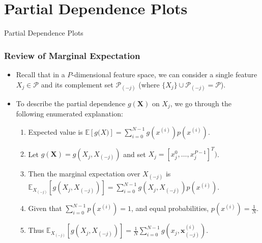 \section{Partial Dependence Plots}

\begin{frame}[c]
\Huge{\centerline{Partial Dependence Plots}}
\end{frame}

\begin{frame}\frametitle{Review of Marginal Expectation}
	\begin{itemize}
		\item Recall that in a $P$-dimensional feature space, we can consider a single feature $X_j \in \mathcal{P}$ and its complement set $\mathcal{P}_{(-j)}$ (where $\{X_j\} \cup \mathcal{P}_{(-j)} = \mathcal{P}$). 
		\item To describe the partial dependence $g(\mathbf{X})$ on $X_j$, we go through the following enumerated explanation:
		\begin{enumerate}
			\item Expected value is $\mathbb{E}[g\mathbf(X)] = \displaystyle\sum_{i = 0}^{N-1}g(x^{(i)})p(x^{(i)})$.
			\item  Let $g(\mathbf{X}) = g(X_j, X_{(-j)})$ and set $X_j = [x_{j}^{0}, \dots, x_{j}^{P-1}]^T)$. 
			\item Then the marginal expectation over $X_{(-j)}$ is $\mathbb{E}_{X_{(-j)}}\left[g(X_j, X_{(-j)})\right] =  \displaystyle\sum_{i = 0}^{N-1} g(X_j, X_{(-j)}) p(x^{(i)})$.
			\item Given that  $\displaystyle\sum_{i = 0}^{N-1} p(x^{(i)}) = 1$, and equal probabilities, $p(x^{(i)}) = \frac{1}{N}$.
			\item Thus $\mathbb{E}_{X_{(-j)}}\left[g(X_j, X_{(-j)})\right] = \displaystyle\frac{1}{N}\sum_{i = 0}^{N-1}g(x_j, \mathbf{x}_{(-j)}^{(i)})$.
		\end{enumerate}
	\end{itemize}
\end{frame}


